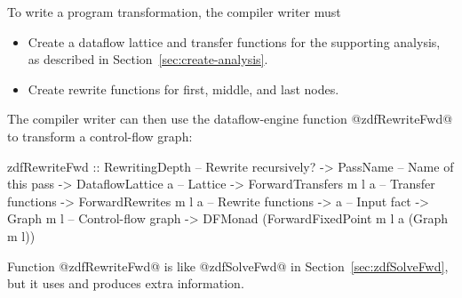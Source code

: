 \documentclass[blockstyle,preprint,nocopyrightspace]{sigplanconf}
\newcommand\secref[1]{Section~\ref{sec:#1}}
\newcommand\seclabel[1]{\label{sec:#1}}
\begin{document}
To write a program transformation,
the compiler writer must 
\begin{itemize}
\item
Create a dataflow lattice and transfer functions for the supporting
analysis, as described in \secref{create-analysis}. 
\item
Create rewrite functions for first, middle, and last nodes.
\end{itemize}
The
compiler writer can then use the 
dataflow-engine function @zdfRewriteFwd@ to transform a control-flow
graph:
\begin{code}
  zdfRewriteFwd 
    :: RewritingDepth         -- Rewrite recursively?
    -> PassName               -- Name of this pass
    -> DataflowLattice a      -- Lattice
    -> ForwardTransfers m l a -- Transfer functions
    -> ForwardRewrites m l a  -- Rewrite functions
    -> a                      -- Input fact
    -> Graph m l              -- Control-flow graph
    -> DFMonad (ForwardFixedPoint m l a (Graph m l))
\end{code}
Function @zdfRewriteFwd@ is like @zdfSolveFwd@ in
\secref{zdfSolveFwd}, but it uses and produces extra
information.\seclabel{engine-truth} 
\end{document}
